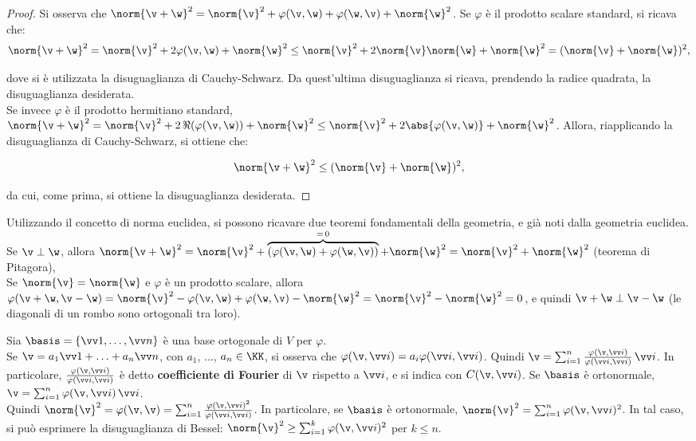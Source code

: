 \begin{proof}
	Si osserva che $\norm{\v + \w}^2 = \norm{\v}^2 + \varphi(\v, \w) + \varphi(\w, \v) + \norm{\w}^2$.
	Se $\varphi$ è il prodotto scalare standard, si ricava che:
	\[ \norm{\v + \w}^2 = \norm{\v}^2 + 2 \varphi(\v, \w) + \norm{\w}^2
	\leq \norm{\v}^2 + 2 \norm{\v} \norm{\w} + \norm{\w}^2 =
	(\norm{\v} + \norm{\w})^2,\]
	
	dove si è utilizzata la disuguaglianza di Cauchy-Schwarz. Da quest'ultima disuguaglianza si ricava, prendendo la radice quadrata, la disuguaglianza
	desiderata. \\
	
	Se invece $\varphi$ è il prodotto hermitiano standard, $\norm{\v + \w}^2 = \norm{\v}^2 + 2 \, \Re(\varphi(\v, \w)) + \norm{\w}^2 \leq \norm{\v}^2 + 2 \abs{\varphi(\v, \w)} + \norm{\w}^2$. Allora, riapplicando
	la disuguaglianza di Cauchy-Schwarz, si ottiene che:
	
	\[ \norm{\v + \w}^2 \leq (\norm{\v} + \norm{\w})^2, \]
	
	da cui, come prima, si ottiene la disuguaglianza desiderata.
\end{proof}

\begin{remark}
	Utilizzando il concetto di norma euclidea, si possono ricavare due teoremi fondamentali della geometria,
	e già noti dalla geometria euclidea. \\
	
	\li Se $\v \perp \w$, allora $\norm{\v + \w}^2 = \norm{\v}^2 + \overbrace{(\varphi(\v, \w) + \varphi(\w, \v))}^{=\,0} + \norm{\w}^2 = \norm{\v}^2 + \norm{\w}^2$ (teorema di Pitagora), \\
	\li Se $\norm{\v} = \norm{\w}$ e $\varphi$ è un prodotto scalare, allora $\varphi(\v + \w, \v - \w) = \norm{\v}^2 - \varphi(\v, \w) + \varphi(\w, \v) - \norm{\w}^2  = \norm{\v}^2 - \norm{\w}^2 = 0$, e quindi
	$\v + \w \perp \v - \w$ (le diagonali di un rombo sono ortogonali tra loro).
\end{remark}

\begin{remark}
	Sia $\basis = \{ \vv 1, \ldots, \vv n \}$ è una base ortogonale di $V$ per $\varphi$. \\
	
	\li Se $\v = a_1 \vv 1 + \ldots + a_n \vv n$, con $a_1$, ..., $a_n \in \KK$, si osserva
	che $\varphi(\v, \vv i) = a_i \varphi(\vv i, \vv i)$. Quindi $\v = \sum_{i=1}^n \frac{\varphi(\v, \vv i)}{\varphi(\vv i, \vv i)} \, \vv i$. In particolare, $\frac{\varphi(\v, \vv i)}{\varphi(\vv i, \vv i)}$ è
	detto \textbf{coefficiente di Fourier} di $\v$ rispetto a $\vv i$, e si indica con $C(\v, \vv i)$. Se $\basis$ è ortonormale,
	$\v = \sum_{i=1}^n \varphi(\v, \vv i) \, \vv i$. \\
	\li Quindi $\norm{\v}^2 = \varphi(\v, \v) = \sum_{i=1}^n \frac{\varphi(\v, \vv i)^2}{\varphi(\vv i, \vv i)}$. In
	particolare, se $\basis$ è ortonormale, $\norm{\v}^2 = \sum_{i=1}^n \varphi(\v, \vv i)^2$. In tal caso,
	si può esprimere la disuguaglianza di Bessel: $\norm{\v}^2 \geq \sum_{i=1}^k \varphi(\v, \vv i)^2$ per $k \leq n$.
\end{remark}

